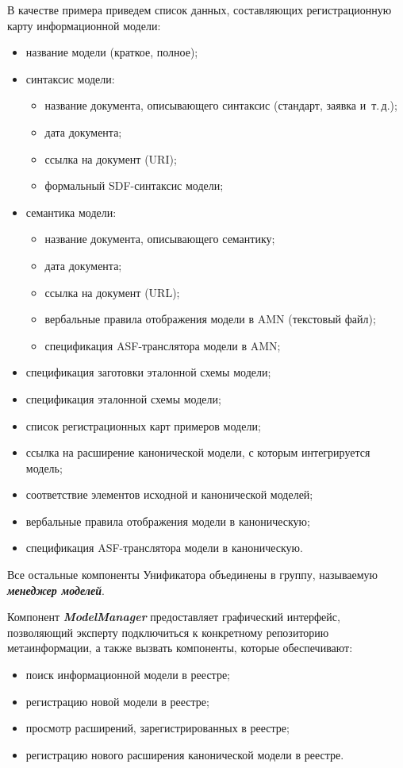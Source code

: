 \begin{multicols}{2}


 В качестве примера приведем
список данных, составляющих регистрационную карту информационной модели:
\begin{itemize}
\item название модели (краткое, полное);
\item синтаксис модели:
\begin{itemize}
\item название документа, описывающего синтаксис (стандарт, заявка и~т.\,д.);
\item дата документа;
\item ссылка на документ (URI);
\item формальный SDF-синтаксис модели;
\end{itemize}
\item семантика модели:
\begin{itemize}
\item название документа, описывающего семантику;
\item дата документа;
\item ссылка на документ (URL);
\item вербальные правила отображения модели в AMN (текстовый файл);
\item спецификация ASF-транслятора модели в AMN;
\end{itemize}
\item спецификация заготовки эталонной схемы модели;
\item спецификация эталонной схемы мо\-дели;
\item список регистрационных карт примеров мо\-дели;
\item ссылка на расширение канонической модели, с которым интегрируется модель;
\item соответствие элементов исходной и канонической моделей;
\item вербальные правила отображения модели в каноническую;
\item спецификация ASF-транслятора модели в каноническую.
\end{itemize}

Все остальные компоненты Унификатора объединены в группу, называемую
{\bfseries\textit{менеджер моделей}}.

Компонент {\bfseries\textit{ModelManager}} предоставляет гра\-фи\-ческий
интерфейс, позволяющий эксперту подключиться к конкретному репозиторию
метаинформации, а также вызвать компоненты, которые обеспечивают:
\begin{itemize}
\item поиск информационной модели в реестре;
\item регистрацию новой модели в реестре;
\item просмотр расширений, зарегистрированных в реестре;
\item регистрацию нового расширения канонической модели в реестре.
\end{itemize}


\end{multicols}
